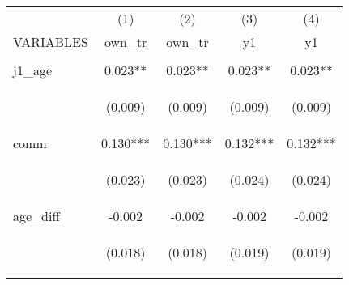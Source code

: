\begin{center}
\begin{tabular}{lcccc} \hline
 & (1) & (2) & (3) & (4) \\
VARIABLES & own\_tr & own\_tr & y1 & y1 \\ \hline
\vspace{4pt} & \begin{footnotesize}\end{footnotesize} & \begin{footnotesize}\end{footnotesize} & \begin{footnotesize}\end{footnotesize} & \begin{footnotesize}\end{footnotesize} \\
j1\_age & 0.023** & 0.023** & 0.023** & 0.023** \\
\vspace{4pt} & \begin{footnotesize}(0.009)\end{footnotesize} & \begin{footnotesize}(0.009)\end{footnotesize} & \begin{footnotesize}(0.009)\end{footnotesize} & \begin{footnotesize}(0.009)\end{footnotesize} \\
comm & 0.130*** & 0.130*** & 0.132*** & 0.132*** \\
\vspace{4pt} & \begin{footnotesize}(0.023)\end{footnotesize} & \begin{footnotesize}(0.023)\end{footnotesize} & \begin{footnotesize}(0.024)\end{footnotesize} & \begin{footnotesize}(0.024)\end{footnotesize} \\
age\_diff & -0.002 & -0.002 & -0.002 & -0.002 \\
\vspace{4pt} & \begin{footnotesize}(0.018)\end{footnotesize} & \begin{footnotesize}(0.018)\end{footnotesize} & \begin{footnotesize}(0.019)\end{footnotesize} & \begin{footnotesize}(0.019)\end{footnotesize} \\

\end{tabular}
\end{center}
